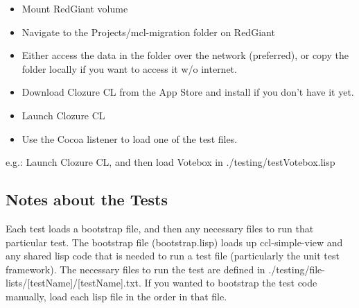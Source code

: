 \documentclass[12pt]{article} %
\begin{document}
\begin{itemize}
\item Mount RedGiant volume	
\item Navigate to the Projects/mcl-migration folder on RedGiant
\item Either access the data in the folder over the network (preferred), or copy the folder locally if you want to access it w/o internet.
\item Download Clozure CL from the App Store and install if you don't have it yet.
\item Launch Clozure CL
\item Use the Cocoa listener to load one of the test files.
\end{itemize}

e.g.: Launch Clozure CL, and then load Votebox in ./testing/testVotebox.lisp

\subsection{Notes about the Tests}

	Each test loads a bootstrap file, and then any necessary files to run that particular test.
		The bootstrap file (bootstrap.lisp) loads up ccl-simple-view and any shared lisp code that is needed to run a test file (particularly the unit test framework). 
		The necessary files to run the test are defined in ./testing/file-lists/[testName]/[testName].txt. If you wanted to bootstrap the test code manually, load each lisp file in the order in that file.









\end{document}
